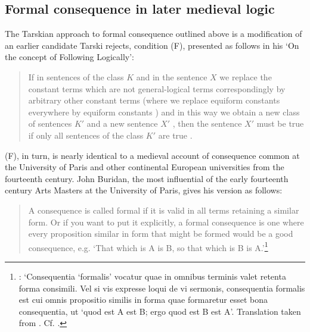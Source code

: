 \documentclass[a4paper, 11pt]{article}
\begin{document}
\subsection{Formal consequence in later medieval logic}
The Tarskian approach to formal consequence outlined above is a modification of an earlier candidate Tarski rejects, condition (F), presented as follows in his `On the concept of Following Logically':

\begin{quote}
	If in sentences of the class $K$ and in the sentence $X$ we replace the constant terms which are not general-logical terms correspondingly by arbitrary other constant terms (where we replace equiform constants everywhere by equiform constants ) and in this way we obtain a new class of sentences $K'$ and a new sentence $X'$ , then the sentence $X'$ must be true if only all sentences of the class $K'$ are true \autocite[183-184]{Tarski2002}.
\end{quote} 

(F), in turn, is nearly identical to a medieval account of consequence common at the University of Paris and other continental European universities from the fourteenth century. John Buridan, the most influential of the early fourteenth century Arts Masters at the University of Paris, gives his version as follows: 

\begin{quote}
A consequence is called formal if it is valid in all terms retaining a similar form. Or if you want to put it explicitly, a formal consequence is one where every proposition similar in form that might be formed would be a good consequence, e.g. `That which is A is B, so that which is B is A.'\footnote{\autocite[23-24]{BuridanTC}: `Consequentia `formalis' vocatur quae in omnibus terminis valet retenta forma consimili. Vel si vis expresse loqui de vi sermonis, consequentia formalis est cui omnis propositio similis in forma quae formaretur esset bona consequentia, ut `quod est A est B; ergo quod est B est A'. Translation taken from \autocite[68]{Buridan2015}. Cf. \autocite[105]{Pseudo-Scotus1891}.}
\end{quote}
\end{document}
